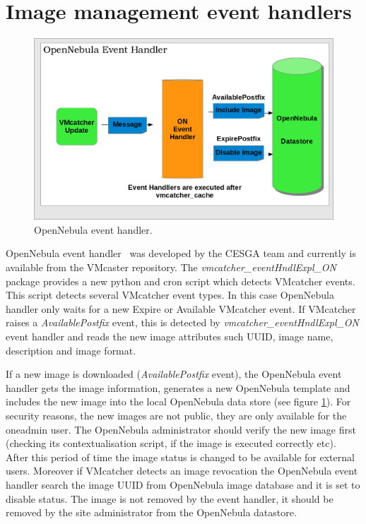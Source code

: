 \documentclass{llncs_Ibergrid2013}
\begin{document}
\section{Image management event handlers}
\label{sect-handlers}
\begin{figure}[h]
\centering
\includegraphics[width=1\textwidth]{ONeventhandler.png}
\caption{OpenNebula event handler.}
\label{fig:onevent}
\end{figure}
OpenNebula event handler~\cite{onevent} was developed by the CESGA team and currently is available from the VMcaster repository. 
The \textit{vmcatcher\_eventHndlExpl\_ON} package provides a new python and cron script which detects VMcatcher events. 
This script detects several VMcatcher event types. In this case OpenNebula handler only waits for a new Expire or Available VMcatcher event.
If VMcatcher raises a \textit{AvailablePostfix} event, this is detected by \textit{vmcatcher\_eventHndlExpl\_ON} event handler and reads the new image attributes such UUID, image name, description and image format.

If a new image is downloaded (\textit{AvailablePostfix} event), the OpenNebula event handler gets the image information, generates a new OpenNebula template and includes the new image into the local OpenNebula data store (see figure \ref{fig:onevent}). 
For security reasons, the new images are not public, they are only available for the oneadmin user. The OpenNebula administrator should verify the new image first (checking its contextualisation script, if the image is executed correctly etc).
After this period of time the image status is changed to be available for external users. 
Moreover if VMcatcher detects an image revocation the OpenNebula event handler search the image UUID from OpenNebula image database and it is set to disable status.
The image is not removed by the event handler, it should be removed by the site administrator from the OpenNebula datastore.
\end{document}
